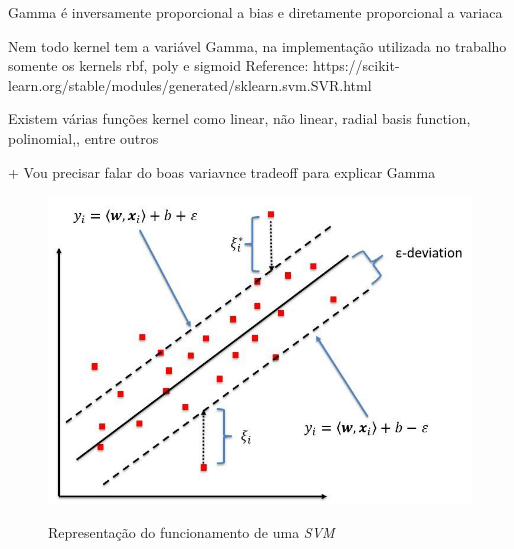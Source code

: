 Gamma é inversamente proporcional a bias e diretamente proporcional a variaca

Nem todo kernel tem a variável Gamma, na implementação utilizada no trabalho somente os kernels rbf, poly e sigmoid 
Reference: https://scikit-learn.org/stable/modules/generated/sklearn.svm.SVR.html




Existem várias funções kernel como linear, não linear, radial basis function, polinomial,, entre outros

+ Vou precisar falar do boas variavnce tradeoff para explicar Gamma


\begin{figure}[h]
    \centering
    \includegraphics[scale=1.0]{monography/img/svr_example.png}
    \label{figure:rf}
    \caption[Representação do funcionamento de uma \textit{\acrshort{SVM}}]{Representação do funcionamento de uma \textit{\acrshort{SVM}}\footnotemark}
\end{figure}



